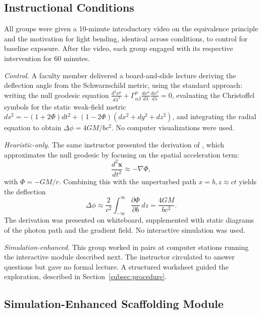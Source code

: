 \documentclass{article}
\begin{document}
\subsection{Instructional Conditions}
\label{subsec:conditions}

All groups were given a 10-minute introductory video on the equivalence principle and the motivation for light bending, identical across conditions, to control for baseline exposure.
After the video, each group engaged with its respective intervention for 60 minutes.

\textit{Control.} A faculty member delivered a board-and-slide lecture deriving the deflection angle from the Schwarzschild metric, using the standard approach: writing the null geodesic equation $\frac{d^2 x^\mu}{d\lambda^2} + \Gamma^\mu_{\alpha\beta}\frac{dx^\alpha}{d\lambda}\frac{dx^\beta}{d\lambda} = 0$, evaluating the Christoffel symbols for the static weak-field metric $ds^2 = -(1+2\Phi)dt^2 + (1-2\Phi)(dx^2+dy^2+dz^2)$, and integrating the radial equation to obtain $\Delta\phi = 4GM/bc^2$. No computer visualizations were used.

\textit{Heuristic-only.} The same instructor presented the derivation of \cite{heuristic_ref}, which approximates the null geodesic by focusing on the spatial acceleration term:
\begin{equation}
\frac{d^2 \mathbf{x}}{d t^2} \approx - \nabla \Phi,
\label{eq:heuristic_accel}
\end{equation}
with $\Phi = -GM/r$. Combining this with the unperturbed path $x = b, z \approx ct$ yields the deflection
\begin{equation}
\Delta\phi \approx \frac{2}{c^2} \int_{-\infty}^{\infty} \frac{\partial \Phi}{\partial b}\, dz = \frac{4GM}{b c^2}.
\label{eq:heuristic_result}
\end{equation}
The derivation was presented on whiteboard, supplemented with static diagrams of the photon path and the gradient field. No interactive simulation was used.

\textit{Simulation-enhanced.} This group worked in pairs at computer stations running the interactive module described next. The instructor circulated to answer questions but gave no formal lecture. A structured worksheet guided the exploration, described in Section~\ref{subsec:procedure}.

\subsection{Simulation-Enhanced Scaffolding Module}
\label{subsec:module}
\end{document}
